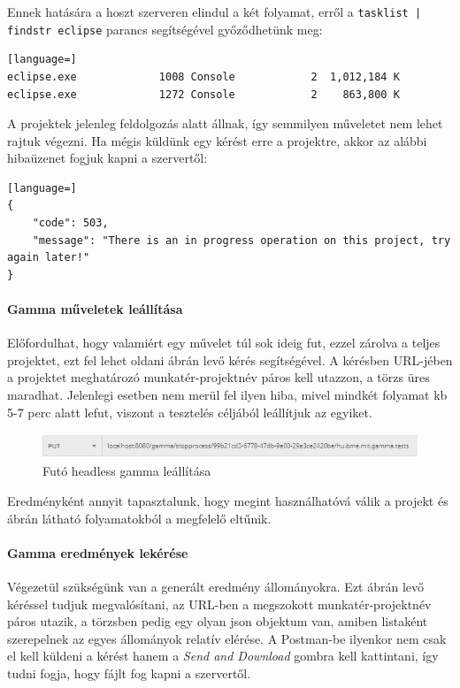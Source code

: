 Ennek hatására a hoszt szerveren elindul a két folyamat, erről a \texttt{tasklist | findstr eclipse} parancs segítségével győződhetünk meg:
\begin{lstlisting}[language=]
eclipse.exe				1008 Console			2  1,012,184 K
eclipse.exe				1272 Console			2  	 863,800 K
\end{lstlisting}

A projektek jelenleg feldolgozás alatt állnak, így semmilyen műveletet nem lehet rajtuk végezni. Ha mégis küldünk egy kérést erre a projektre, akkor az alábbi hibaüzenet fogjuk kapni a szervertől:

\begin{lstlisting}[language=]
{
	"code": 503,
	"message": "There is an in progress operation on this project, try again later!"
}
\end{lstlisting}

\paragraph{Gamma műveletek leállítása} Előfordulhat, hogy valamiért egy művelet túl sok ideig fut, ezzel zárolva a teljes projektet, ezt fel lehet oldani  ábrán levő kérés segítségével. A kérésben URL-jében a projektet meghatározó munkatér-projektnév páros kell utazzon, a törzs üres maradhat. Jelenlegi esetben nem merül fel ilyen hiba, mivel mindkét folyamat kb 5-7 perc alatt lefut, viszont a tesztelés céljából leállítjuk az egyiket.


\begin{figure}[!ht]
	\includegraphics[width=150mm, keepaspectratio]{figures/stop_gamma_request.PNG}
	\caption{Futó headless gamma leállítása}
	\label{fig:stop_gamma_request}
\end{figure}

Eredményként annyit tapasztalunk, hogy megint használhatóvá válik a projekt és  ábrán látható folyamatokból a megfelelő eltűnik.

\paragraph{Gamma eredmények lekérése} Végezetül szükségünk van a generált eredmény állományokra. Ezt  ábrán levő kéréssel tudjuk megvalósítani, az URL-ben a megszokott munkatér-projektnév páros utazik, a törzsben pedig egy olyan json objektum van, amiben listaként szerepelnek az egyes állományok relatív elérése. A Postman-be ilyenkor nem csak el kell küldeni a kérést hanem a \textit{Send and Download} gombra kell kattintani, így tudni fogja, hogy fájlt fog kapni a szervertől.

